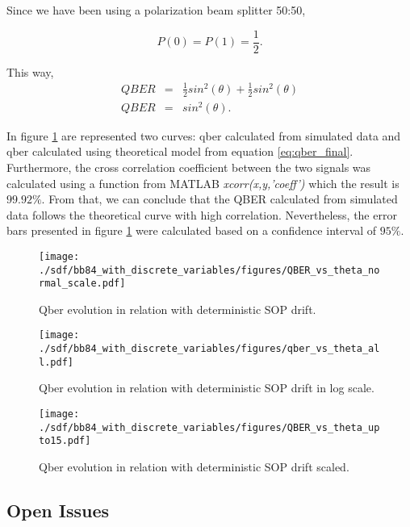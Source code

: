 \begin{refsection}
Since we have been using a polarization beam splitter 50:50,

\begin{equation*}
  P(0) = P(1) = \frac{1}{2}.
\end{equation*}

This way,
\begin{eqnarray}\label{eq:qber_final}
   QBER & = & \frac{1}{2}sin^2(\theta)+ \frac{1}{2}sin^2(\theta)\\
   QBER & = & sin^2(\theta).
\end{eqnarray}

 In figure \ref{qber} are represented two curves: qber calculated from simulated data and qber calculated using theoretical model from equation \ref{eq:qber_final}. Furthermore, the cross correlation coefficient between the two signals was calculated using a function from MATLAB \textit{xcorr(x,y,'coeff')} which the result is $99.92\%$. From that, we can conclude that the QBER calculated from simulated data follows the theoretical curve with high correlation. Nevertheless, the error bars presented in figure \ref{qber} were calculated based on a confidence interval of $95\%$.

\begin{figure}[h]
    \centering
        \texttt{[image: ./sdf/bb84\_with\_discrete\_variables/figures/QBER\_vs\_theta\_normal\_scale.pdf]}
    \caption{Qber evolution in relation with deterministic SOP drift.}\label{qber}
\end{figure}

\begin{figure}[H]
    \centering
        \texttt{[image: ./sdf/bb84\_with\_discrete\_variables/figures/qber\_vs\_theta\_all.pdf]}
    \caption{Qber evolution in relation with deterministic SOP drift in log scale.}\label{qber_log}
\end{figure}

\begin{figure}[H]
    \centering
        \texttt{[image: ./sdf/bb84\_with\_discrete\_variables/figures/QBER\_vs\_theta\_upto15.pdf]}
    \caption{Qber evolution in relation with deterministic SOP drift scaled.}\label{qber_log_scaled}
\end{figure}
\newpage

\subsection{Open Issues}
\begin{enumerate}
   

\end{enumerate}
\end{refsection}
